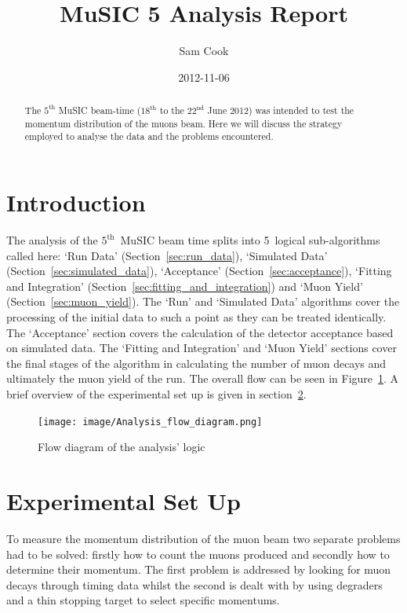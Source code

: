 \documentclass[]{article}
\title{MuSIC 5 Analysis Report}
\author{Sam Cook}
\date{2012-11-06}
\newcommand{\nth}[1]{$#1^\text{th}$}
\newcommand{\nthTwo}[2]{$#1^\text{#2}$}
\begin{document}
\ifpdf
{}
\else
{}
\fi

\maketitle


\begin{abstract}
    The \nth{5} MuSIC beam-time (\nth{18} to the \nthTwo{22}{nd} June 2012) was intended to test the momentum distribution of the muons beam. Here we will discuss the strategy employed to analyse the data and the problems encountered.
\end{abstract}

\section{Introduction} %
\label{sec:introduction}
The analysis of the \nth{5}~MuSIC beam time splits into 5~logical sub-algorithms called here: `Run Data' (Section~\ref{sec:run_data}), `Simulated Data' (Section~\ref{sec:simulated_data}), `Acceptance' (Section~\ref{sec:acceptance}), `Fitting and Integration' (Section~\ref{sec:fitting_and_integration}) and `Muon Yield' (Section~\ref{sec:muon_yield}). The `Run' and `Simulated Data' algorithms cover the processing of the initial data to such a point as they can be treated identically. The `Acceptance' section covers the calculation of the detector acceptance based on simulated data. The `Fitting and Integration' and `Muon Yield' sections cover the final stages of the algorithm in calculating the number of muon decays and ultimately the muon yield of the run. The overall flow can be seen in Figure~\ref{fig:analysis_flow_diagrm}. A brief overview of the experimental set up is given in section~\ref{sec:experimental_set_up}.

\begin{figure}[htbp]
    \centering
        \texttt{[image: image/Analysis\_flow\_diagram.png]}
    \caption{Flow diagram of the analysis' logic}
    \label{fig:analysis_flow_diagrm}
\end{figure}
\section{Experimental Set Up} %
\label{sec:experimental_set_up}
To measure the momentum distribution of the muon beam two separate problems had to be solved: firstly how to count the muons produced and secondly how to determine their momentum. The first problem is addressed by looking for muon decays through timing data whilst the second is dealt with by using degraders and a thin stopping target to select specific momentums. 
\end{document}
